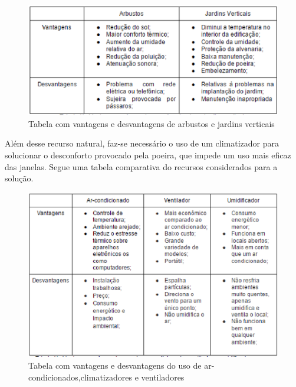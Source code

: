 \begin{figure}[!h]
  \centering
  \includegraphics[keepaspectratio=true,scale=1]{figuras/tabela_vantagens_e_desvantagens_do_jardim_vertical.eps}
  \caption{Tabela com vantagens e desvantagens de arbustos e jardins verticais}
  \label{fig:comparativo_jartins}
\end{figure}

Além desse recurso natural, faz-se necessário o uso de um climatizador para solucionar o desconforto provocado pela poeira, que impede um uso mais eficaz das janelas. Segue uma tabela comparativa do recursos considerados para a solução.

\begin{figure}[!h]
  \centering
  \includegraphics[keepaspectratio=true,scale=1]{figuras/tabela_vantagens_e_desvantagens_do_climatizador.eps}
  \caption{Tabela com vantagens e desvantagens do uso de ar-condicionados,climatizadores e ventiladores}
  \label{fig:comparativo_climatizador}
\end{figure}

